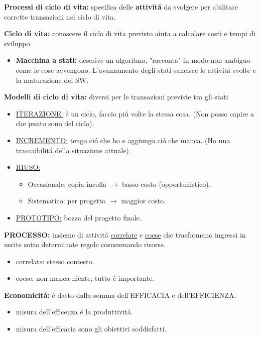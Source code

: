 \documentclass{article}
\begin{document}
\bigbreak
\textbf{Processi di ciclo di vita:} specifica delle \textbf{attivit\'a} da svolgere per abilitare corrette transazioni nel ciclo di vita.

\bigbreak
\textbf{Ciclo di vita:} conoscere il ciclo di vita previsto aiuta a calcolare costi e tempi di sviluppo.
    \begin{itemize}
        \item \textbf{Macchina a stati:} descrive un algoritmo, 
        "racconta" in modo non ambiguo come le cose avvengono. L'avanzamento degli stati sancisce le attivit\'a svolte e la maturazione del SW.
    \end{itemize}
    
\textbf{Modelli di ciclo di vita:} diversi per le transazioni previste tra gli stati
    \begin{itemize}
        \item \underline{ITERAZIONE:} \'e un ciclo, faccio pi\'u volte la stessa cosa. (Non posso capire a che punto sono del ciclo).
        \item \underline{INCREMENTO:} tengo ci\'o che ho e aggiungo ci\'o che manca. (Ho una traccaibilit\'a della situazione attuale).
        \item \underline{RIUSO:} 
            \begin{itemize}
                \item Occasionale: copia-incolla $\rightarrow$ basso costo (opportunistico).
                \item Sistematico: per progetto $\rightarrow$ maggior costo.
            \end{itemize}
        \item \underline{PROTOTIPO:} bozza del progetto finale.
    \end{itemize}
    
\bigbreak
\textbf{PROCESSO: }insieme di attivit\'a \underline{correlate} e \underline{coese} che trasformano ingressi in uscite sotto determinate regole cosnsumando risorse.
    \begin{itemize}
        \item correlate: stesso contesto.
        \item coese: non manca niente, tutto \'e importante.
    \end{itemize}

\bigbreak
\textbf{Economicit\'a:} \'e datto dalla somma dell'EFFICACIA e dell'EFFICIENZA. 
    \begin{itemize}
        \item misura dell'efficenza \'e la produttivit\'a.
        \item misura dell'efficacia sono gli obiettivi soddisfatti.
    \end{itemize}
\end{document}
